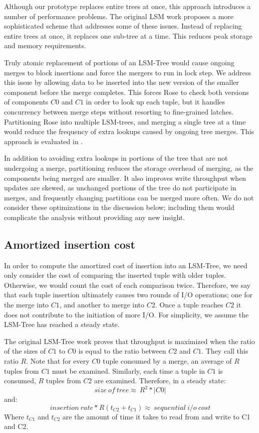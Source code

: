 \documentclass{vldb}
\newcommand{\rows}{Rose\xspace}
\begin{document}
Although our prototype replaces entire trees at once, this approach
introduces a number of performance problems.  The original LSM work
proposes a more sophisticated scheme that addresses some of these
issues.  Instead of replacing entire trees at once, it replaces one
sub-tree at a time.  This reduces peak storage and memory requirements.

Truly atomic replacement of portions of an LSM-Tree would cause ongoing
merges to block insertions and force the mergers to run in lock step.
We address this issue by allowing data to be inserted into
the new version of the smaller component before the merge completes.
This forces \rows to check both versions of components $C0$ and $C1$
in order to look up each tuple, but it handles concurrency between merge steps
without resorting to fine-grained latches.  Partitioning \rows into multiple
 LSM-trees, and merging a single tree at a time would reduce the frequency
of extra lookups caused by ongoing tree merges.  This approach is
evaluated in \cite{XXX}.

In addition to avoiding
extra lookups in portions of the tree that are not undergoing a merge,
partitioning reduces the storage overhead of merging, as the
components being merged are smaller.  It also improves write
throughput when updates are skewed, as unchanged portions of the tree
do not participate in merges, and frequently changing partitions can
be merged more often.  We do not consider these optimizations in the
discussion below; including them would complicate the analysis without
providing any new insight.

\subsection{Amortized insertion cost}

In order to compute the amortized cost of insertion into an LSM-Tree,
we need only consider the cost of comparing the inserted tuple with
older tuples.  Otherwise, we would count the cost of each comparison
twice.  Therefore, we say that each tuple insertion ultimately causes
two rounds of I/O operations; one for the merge into $C1$, and another
to merge into $C2$.  Once a tuple reaches $C2$ it does not contribute
to the initiation of more I/O.  For simplicity, we assume the LSM-Tree
has reached a steady state.

The original LSM-Tree work proves that throughput
is maximized when the ratio of the sizes of $C1$ to $C0$ is equal to
the ratio between $C2$ and $C1$.  They call this ratio $R$.  Note that
for every $C0$ tuple consumed by a
merge, an average of $R$ tuples from $C1$ must be examined.  Similarly, each time a
tuple in $C1$ is consumed, $R$ tuples from $C2$ are examined.
Therefore, in a steady state:
\[size~of~tree\approx~R^2*|C0|\]
and:
\[insertion~rate*R(t_{C2}+t_{C1})\approx~sequential~i/o~cost\]
Where $t_{C1}$ and $t_{C2}$ are the amount of time it takes to read
from and write to C1 and C2.
\end{document}
